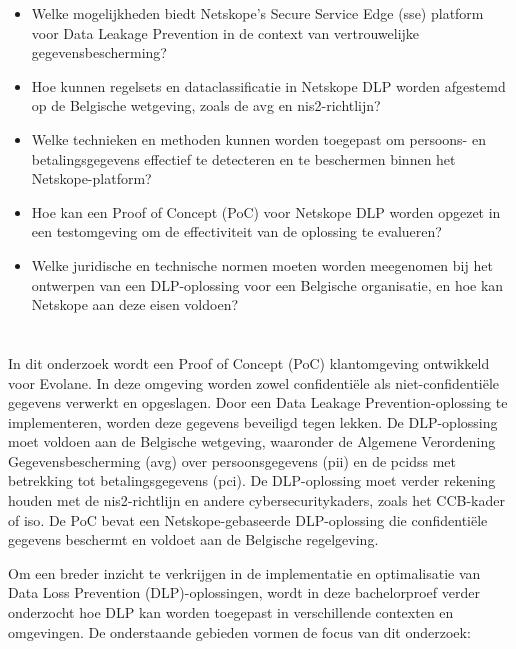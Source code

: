 \begin{itemize}
    \item Welke mogelijkheden biedt Netskope's Secure Service Edge (\gls{sse}) platform voor Data Leakage Prevention in de context van vertrouwelijke gegevensbescherming?
    \item Hoe kunnen regelsets en dataclassificatie in Netskope DLP worden afgestemd op de Belgische wetgeving, zoals de \gls{avg} en \gls{nis2}-richt\-lijn?
    \item Welke technieken en methoden kunnen worden toegepast om persoons- en betalingsgegevens effectief te detecteren en te beschermen binnen het Net\-skope-platform?
    \item Hoe kan een Proof of Concept (PoC) voor Netskope DLP worden opgezet in een testomgeving om de effectiviteit van de oplossing te evalueren?
    \item Welke juridische en technische normen moeten worden meegenomen bij het ontwerpen van een DLP-oplossing voor een Belgische organisatie, en hoe kan Netskope aan deze eisen voldoen?
\end{itemize}


\section{}%
\label{sec:onderzoeksdoelstelling}

In dit onderzoek wordt een Proof of Concept (PoC) klantomgeving ontwikkeld voor Evolane. 
In deze omgeving worden zowel confidentiële als niet-confidentiële gegevens verwerkt en opgeslagen. 
Door een Data Leakage Prevention-oplossing te implementeren, worden deze gegevens beveiligd tegen lekken. De DLP-oplossing moet voldoen aan de Belgische wetgeving, 
waaronder de Algemene Verordening Gegevensbescherming (\gls{avg}) over persoonsgegevens (\gls{pii}) en de \gls{pcidss} met betrekking tot betalingsgegevens (\gls{pci}). 
De DLP-oplossing moet verder rekening houden met de \gls{nis2}-richtlijn en andere cybersecuritykaders, zoals het CCB-kader of \gls{iso}. 
De PoC bevat een Netskope-gebaseerde DLP-oplossing die confidentiële gegevens beschermt en voldoet aan de Belgische regelgeving. 

Om een breder inzicht te verkrijgen in de implementatie en optimalisatie van Data Loss Prevention (DLP)-oplossingen, wordt in deze bachelorproef verder onderzocht hoe DLP kan worden toegepast in verschillende contexten en omgevingen. De onderstaande gebieden vormen de focus van dit onderzoek:

